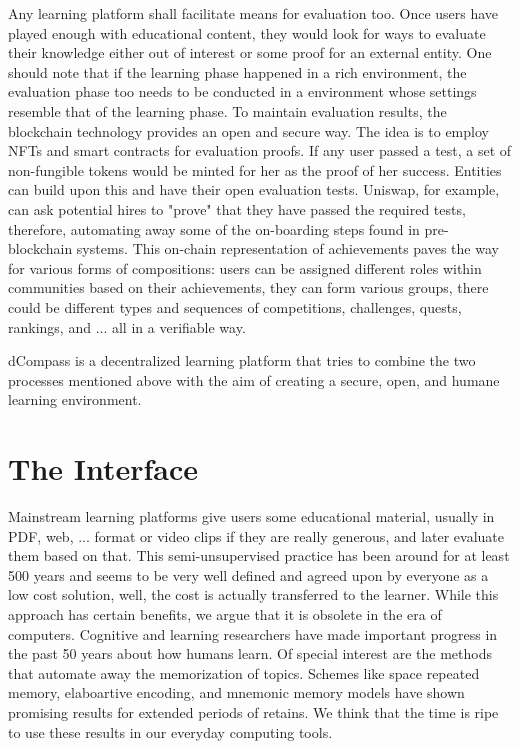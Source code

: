 \documentclass[12pt, a4paper]{article}
\begin{document}
Any learning platform shall facilitate means for evaluation too. Once users have played enough with  educational content, they would look for ways to evaluate their knowledge either out of interest or some proof for an external entity. One should note that if the learning phase happened in a rich environment, the evaluation phase too needs to be conducted in a environment whose settings resemble that of the learning phase. To maintain evaluation results, the blockchain technology provides an open and secure way. The idea is to employ NFTs and smart contracts for evaluation proofs. If any user passed a test, a set of non-fungible tokens would be minted for her as the proof of her success. Entities can build upon this and have their open evaluation tests. Uniswap, for example, can ask potential hires to "prove" that they have passed the required tests, therefore, automating away some of the on-boarding steps found in pre-blockchain systems. This on-chain representation of achievements paves the way for various forms of compositions: users can be assigned different roles within communities based on their achievements, they can form various groups, there could be different types and sequences of competitions, challenges, quests, rankings, and ... all in a verifiable way.

dCompass is a decentralized learning platform that tries to combine the two processes mentioned above with the aim of creating a secure, open, and humane learning environment.

\section*{The Interface}
Mainstream learning platforms give users some educational material, usually in PDF, web, ... format or video clips if they are really generous, and later evaluate them based on that. This semi-unsupervised practice has been around for at least 500 years and seems to be very well defined and agreed upon by everyone as a low cost solution, well, the cost is actually transferred to the learner. While this approach has certain benefits, we argue that it is obsolete in the era of computers. Cognitive and learning researchers have made important progress in the past 50 years about how humans learn. Of special interest are the methods that automate away the memorization of topics. Schemes like space repeated memory, elaboartive encoding, and mnemonic memory models have shown promising results for extended periods of retains. We think that the time is ripe to use these results in our everyday computing tools.
\end{document}
